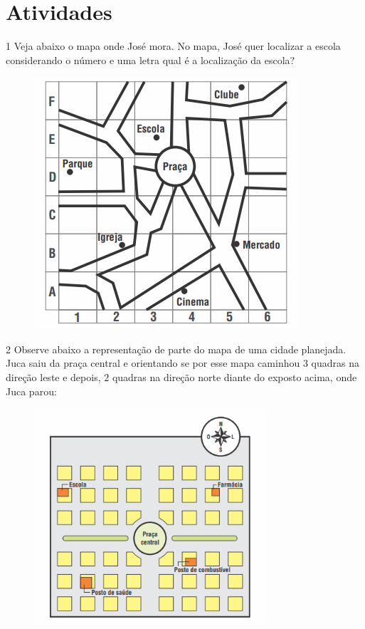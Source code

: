 \section{Atividades}

\num{1}  Veja abaixo o mapa onde José mora. No mapa, José quer localizar a escola considerando o número e uma letra
qual é a localização da escola?

\begin{figure}[h]
\centering\includegraphics[width=3.86042in,height=3.68611in]{./imgSAEB_6_MAT/media/image64.png}
\end{figure}


\num{2}  Observe abaixo a representação de parte do mapa de uma cidade
planejada. Juca saiu da praça central e orientando se por esse mapa caminhou $3$
quadras na direção leste e depois, $2$ quadras na direção norte diante do
exposto acima, onde Juca parou:

\begin{figure}[h]
\centering\includegraphics[width=3.39535in,height=3.14326in]{./imgSAEB_6_MAT/media/image65.png}
\end{figure}

